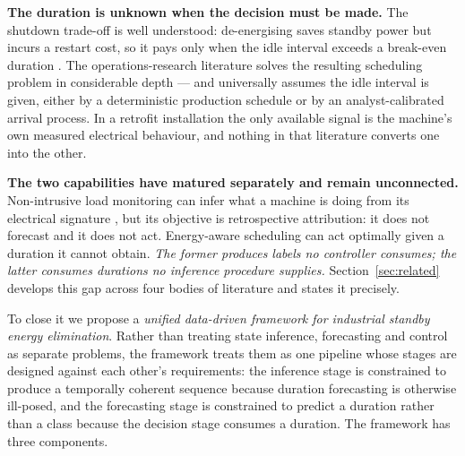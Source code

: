 \textbf{The duration is unknown when the decision must be made.} The
shutdown trade-off is well understood: de-energising saves standby power
but incurs a restart cost, so it pays only when the idle interval
exceeds a break-even duration \cite{mouzon2007operational}. The
operations-research literature solves the resulting scheduling problem
in considerable depth --- and universally assumes the idle interval is
given, either by a deterministic production schedule or by an
analyst-calibrated arrival process. In a retrofit installation the only
available signal is the machine's own measured electrical behaviour, and
nothing in that literature converts one into the other.

\textbf{The two capabilities have matured separately and remain
unconnected.} Non-intrusive load monitoring can infer what a machine is
doing from its electrical signature \cite{hart1992nonintrusive}, but its
objective is retrospective attribution: it does not forecast and it does
not act. Energy-aware scheduling can act optimally given a duration it
cannot obtain. \emph{The former produces labels no controller consumes;
the latter consumes durations no inference procedure supplies.}
Section~\ref{sec:related} develops this gap across four bodies of
literature and states it precisely.

\medskip
\noindent
To close it we propose a \emph{unified data-driven framework for
industrial standby energy elimination}. Rather than treating state
inference, forecasting and control as separate problems, the framework
treats them as one pipeline whose stages are designed against each
other's requirements: the inference stage is constrained to produce a
temporally coherent sequence because duration forecasting is otherwise
ill-posed, and the forecasting stage is constrained to predict a
duration rather than a class because the decision stage consumes a
duration. The framework has three components.

